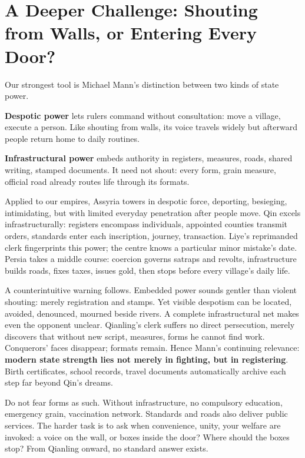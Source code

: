 \section[Further Challenge: Walls or Doorways?]{A Deeper Challenge: Shouting from Walls, or Entering Every Door?}
Our strongest tool is Michael Mann's distinction between two kinds of state power.

\textbf{Despotic power} lets rulers command without consultation: move a village, execute a person. Like shouting from walls, its voice travels widely but afterward people return home to daily routines.

\textbf{Infrastructural power} embeds authority in registers, measures, roads, shared writing, stamped documents. It need not shout: every form, grain measure, official road already routes life through its formats.

Applied to our empires, Assyria towers in despotic force, deporting, besieging, intimidating, but with limited everyday penetration after people move. Qin excels infrastructurally: registers encompass individuals, appointed counties transmit orders, standards enter each inscription, journey, transaction. Liye's reprimanded clerk fingerprints this power; the centre knows a particular minor mistake's date. Persia takes a middle course: coercion governs satraps and revolts, infrastructure builds roads, fixes taxes, issues gold, then stops before every village's daily life.

A counterintuitive warning follows. Embedded power sounds gentler than violent shouting: merely registration and stamps. Yet visible despotism can be located, avoided, denounced, mourned beside rivers. A complete infrastructural net makes even the opponent unclear. Qianling's clerk suffers no direct persecution, merely discovers that without new script, measures, forms he cannot find work. Conquerors' faces disappear; formats remain. Hence Mann's continuing relevance: \textbf{modern state strength lies not merely in fighting, but in registering}. Birth certificates, school records, travel documents automatically archive each step far beyond Qin's dreams.

Do not fear forms as such. Without infrastructure, no compulsory education, emergency grain, vaccination network. Standards and roads also deliver public services. The harder task is to ask when convenience, unity, your welfare are invoked: a voice on the wall, or boxes inside the door? Where should the boxes stop? From Qianling onward, no standard answer exists.

